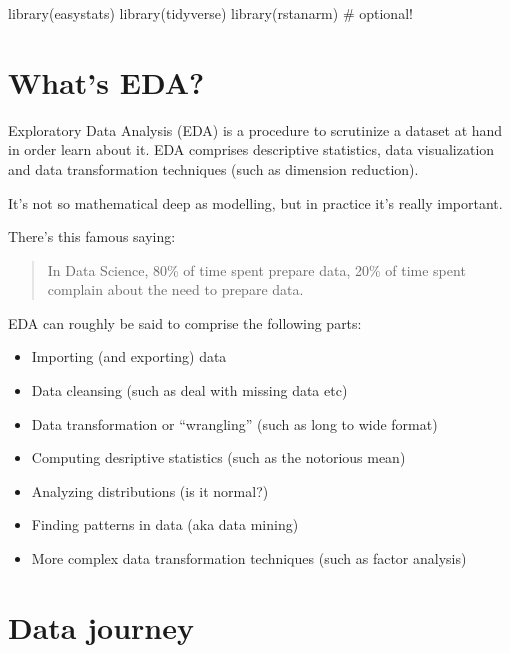 \documentclass[
  letterpaper,
  DIV=11,
  numbers=noendperiod]{scrreprt}
\newenvironment{Shaded}{\begin{snugshade}}{\end{snugshade}}
\newcommand{\CommentTok}[1]{\textcolor[rgb]{0.37,0.37,0.37}{#1}}
\newcommand{\FunctionTok}[1]{\textcolor[rgb]{0.28,0.35,0.67}{#1}}
\newcommand{\NormalTok}[1]{\textcolor[rgb]{0.00,0.23,0.31}{#1}}
\providecommand{\tightlist}{%
  \setlength{\itemsep}{0pt}\setlength{\parskip}{0pt}}\usepackage{longtable,booktabs,array}
\theoremstyle{definition}
\theoremstyle{definition}
\theoremstyle{remark}
\begin{document}
\begin{Shaded}
\begin{Highlighting}[]
\FunctionTok{library}\NormalTok{(easystats)}
\FunctionTok{library}\NormalTok{(tidyverse)}
\FunctionTok{library}\NormalTok{(rstanarm)  }\CommentTok{\# optional!}
\end{Highlighting}
\end{Shaded}

\hypertarget{whats-eda}{%
\section{What's EDA?}\label{whats-eda}}

Exploratory Data Analysis (EDA) is a procedure to scrutinize a dataset
at hand in order learn about it. EDA comprises descriptive statistics,
data visualization and data transformation techniques (such as dimension
reduction).

It's not so mathematical deep as modelling, but in practice it's really
important.

There's this famous saying:

\begin{quote}
In Data Science, 80\% of time spent prepare data, 20\% of time spent
complain about the need to prepare data.
\end{quote}

EDA can roughly be said to comprise the following parts:

\begin{itemize}
\tightlist
\item
  Importing (and exporting) data
\item
  Data cleansing (such as deal with missing data etc)
\item
  Data transformation or ``wrangling'' (such as long to wide format)
\item
  Computing desriptive statistics (such as the notorious mean)
\item
  Analyzing distributions (is it normal?)
\item
  Finding patterns in data (aka data mining)
\item
  More complex data transformation techniques (such as factor analysis)
\end{itemize}

\hypertarget{data-journey}{%
\section{Data journey}\label{data-journey}}
\end{document}
